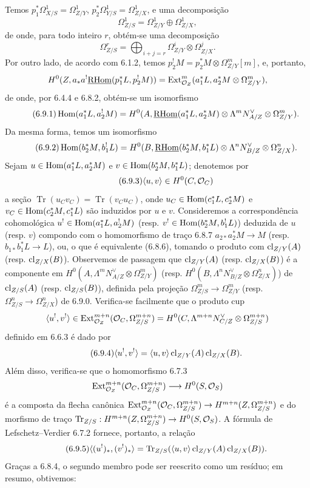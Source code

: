 Temos $p_1^*\Omega^1_{X/S}=\Omega^1_{Z/Y}$, $p_2^*\Omega^1_{Y/S}=\Omega^1_{Z/X}$, e uma decomposição
\[
\Omega^1_{Z/S}=\Omega^1_{Z/Y}\oplus\Omega^1_{Z/X},
\]
de onde, para todo inteiro $r$, obtém-se uma decomposição
\begin{equation}
\tag{6.9.0}
\Omega^r_{Z/S}=\bigoplus_{i+j=r}\Omega^i_{Z/Y}\otimes\Omega^j_{Z/X}.
\end{equation}
Por outro lado, de acordo com 6.1.2, temos $p_2^!M=p_2^*M\otimes\Omega^m_{Z/Y}[m]$, e, portanto,
\[
H^0(Z,a_*a^!\underline{\mathrm{RHom}}(p_1^*L,p_2^!M))=\operatorname{Ext}^m_{\mathcal{O}_Z}(a_1^*L,a_2^*M\otimes\Omega^m_{Z/Y}),
\]
de onde, por 6.4.4 e 6.8.2, obtém-se um isomorfismo
\begin{equation}
\tag{6.9.1}
\operatorname{Hom}(a_1^*L,a_2^!M)=H^0(A,\underline{\mathrm{RHom}}(a_1^*L,a_2^*M)\otimes\Lambda^m N_{A/Z}^{\vee}\otimes\Omega^m_{Z/Y}).
\end{equation}
Da mesma forma, temos um isomorfismo
\begin{equation}
\tag{6.9.2}
\operatorname{Hom}(b_2^*M,b_1^!L)=H^0(B,\underline{\mathrm{RHom}}(b_2^*M,b_1^*L)\otimes\Lambda^n N_{B/Z}^{\vee}\otimes\Omega^n_{Z/X}).
\end{equation}
Sejam $u\in\operatorname{Hom}(a_1^*L,a_2^*M)$ e $v\in\operatorname{Hom}(b_2^*M,b_1^*L)$; denotemos por
\begin{equation}
\tag{6.9.3}
\langle u,v\rangle\in H^0(C,\mathcal{O}_C)
\end{equation}
a seção $\operatorname{Tr}(u_Cv_C)=\operatorname{Tr}(v_Cu_C)$, onde $u_C\in\operatorname{Hom}(c_1^*L,c_2^*M)$ e $v_C\in\operatorname{Hom}(c_2^*M,c_1^*L)$ são induzidos por $u$ e $v$. Consideremos a correspondência cohomológica $u^!\in\operatorname{Hom}(a_1^*L,a_2^!M)$ (resp. $v^!\in\operatorname{Hom}(b_2^*M,b_1^!L)$) deduzida de $u$ (resp. $v$) compondo com o homomorfismo de traço 6.8.7 $a_{2*}a_2^*M\to M$ (resp. $b_{1*}b_1^*L\to L$), ou, o que é equivalente (6.8.6), tomando o produto com $\operatorname{cl}_{Z/Y}(A)$ (resp. $\operatorname{cl}_{Z/X}(B)$). Observemos de passagem que $\operatorname{cl}_{Z/Y}(A)$ (resp. $\operatorname{cl}_{Z/X}(B)$) é a componente em $H^0(A,\Lambda^mN_{A/Z}^{\vee}\otimes\Omega^m_{Z/Y})$ (resp. $H^0(B,\Lambda^nN_{B/Z}^{\vee}\otimes\Omega^n_{Z/X})$) de $\operatorname{cl}_{Z/S}(A)$ (resp. $\operatorname{cl}_{Z/S}(B)$), definida pela projeção $\Omega^m_{Z/S}\to\Omega^m_{Z/Y}$ (resp. $\Omega^n_{Z/S}\to\Omega^n_{Z/X}$) de 6.9.0. Verifica-se facilmente que o produto cup
\[
\langle u^!,v^!\rangle\in\operatorname{Ext}^{m+n}_{\mathcal{O}_Z}(\mathcal{O}_C,\Omega^{m+n}_{Z/S})=H^0(C,\Lambda^{m+n}N_{C/Z}^{\vee}\otimes\Omega^{m+n}_{Z/S})
\]
definido em 6.6.3 é dado por
\begin{equation}
\tag{6.9.4}
\langle u^!,v^!\rangle=\langle u,v\rangle\operatorname{cl}_{Z/Y}(A)\operatorname{cl}_{Z/X}(B).
\end{equation}
Além disso, verifica-se que o homomorfismo 6.7.3
\[
\operatorname{Ext}^{m+n}_{\mathcal{O}_Z}(\mathcal{O}_C,\Omega^{m+n}_{Z/S})\longrightarrow H^0(S,\mathcal{O}_S)
\]
é a composta da flecha canônica $\operatorname{Ext}^{m+n}_{\mathcal{O}_Z}(\mathcal{O}_C,\Omega^{m+n}_{Z/S})\to H^{m+n}(Z,\Omega^{m+n}_{Z/S})$ e do morfismo de traço $\operatorname{Tr}_{Z/S}:H^{m+n}(Z,\Omega^{m+n}_{Z/S})\to H^0(S,\mathcal{O}_S)$. A fórmula de Lefschetz--Verdier 6.7.2 fornece, portanto, a relação
\begin{equation}
\tag{6.9.5}
\langle (u^!)_*,(v^!)_*\rangle=\operatorname{Tr}_{Z/S}(\langle u,v\rangle\operatorname{cl}_{Z/Y}(A)\operatorname{cl}_{Z/X}(B)).
\end{equation}
Graças a 6.8.4, o segundo membro pode ser reescrito como um resíduo; em resumo, obtivemos:

